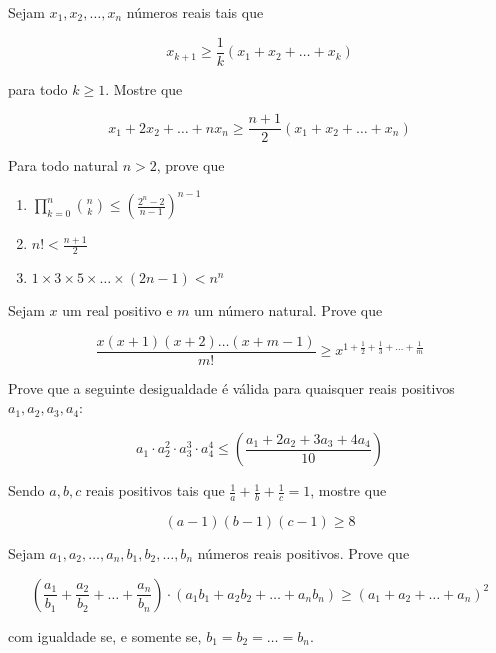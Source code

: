 \begin{questao}
  Sejam $x_1,x_2,\ldots,x_n$ números reais tais que

  $$ x_{k+1} \geq \frac{1}{k}(x_1+x_2+\ldots +x_k) $$

  para todo $k \geq 1$. Mostre que

  $$ x_1+2x_2+\ldots +nx_n \geq \frac{n+1}{2}(x_1+x_2+\ldots +x_n) $$
\end{questao}

\begin{questao}
  Para todo natural $n > 2$, prove que

  \begin{enumerate}

  \item $\prod_{k=0}^{n} \binom{n}{k} \leq \left( \frac{2^n-2}{n-1}
    \right)^{n-1}$

  \item $ n! < \frac{n+1}{2} $

  \item $1 \times 3 \times 5 \times \ldots \times (2n-1) < n^n $
  \end{enumerate}

\end{questao}

\begin{questao}
  Sejam $x$ um real positivo e $m$ um número natural. Prove que

  $$ \frac{x(x+1)(x+2) \ldots (x+m-1)}{m!} \geq
  x^{1+\frac{1}{2}+\frac{1}{3}+\ldots+\frac{1}{m}} $$
\end{questao}

\begin{questao}
  Prove que a seguinte desigualdade é válida para quaisquer reais positivos
  $a_1,a_2,a_3,a_4$:

  $$ a_1 \cdot a_2^2 \cdot a_3^3 \cdot a_4^4 \leq \left(
  \frac{a_1+2a_2+3a_3+4a_4}{10}\right) $$
\end{questao}

\begin{questao}
  Sendo $a,b,c$ reais positivos tais que
  $\frac{1}{a}+\frac{1}{b}+\frac{1}{c}=1$, mostre que

  $$(a-1)(b-1)(c-1) \geq 8$$
\end{questao}

\begin{questao}
  Sejam $a_1,a_2,\ldots,a_n,b_1,b_2,\ldots,b_n$ números reais positivos. Prove
  que

  $$ \left( \frac{a_1}{b_1} + \frac{a_2}{b_2} + \ldots + \frac{a_n}{b_n} \right)
  \cdot (a_1b_1 + a_2b_2 + \ldots + a_nb_n) \geq (a_1+a_2+\ldots+a_n)^2 $$

  com igualdade se, e somente se, $b_1 = b_2 = \ldots = b_n$.
\end{questao}

